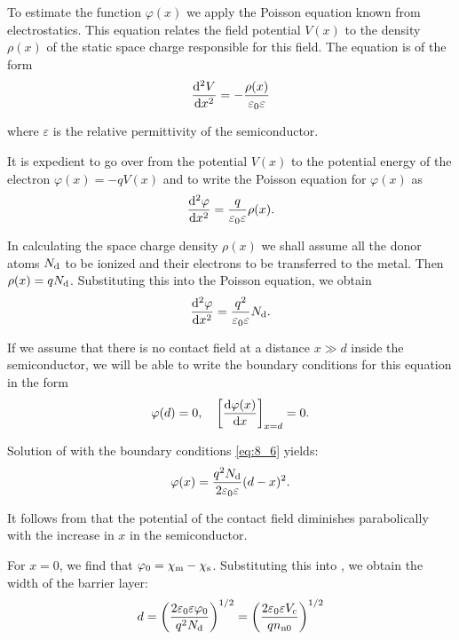 To estimate the function $\varphi(x)$ we apply the Poisson equation known from electrostatics. This equation relates the field potential $V(x)$ to the density $\rho(x)$ of the static space charge responsible for this field. The equation is of the form
\begin{equation}\label{eq:8_3}
    \dfrac{\mathrm{d}^2V}{\mathrm{d} x^2} = - \frac{\rho(x)}{\varepsilon_0 \varepsilon}
\end{equation}

\noindent
where $\varepsilon$ is the relative permittivity of the semiconductor.

It is expedient to go over from the potential $V(x)$ to the potential energy of the electron $\varphi(x)= -qV(x)$ and to write the Poisson equation for $\varphi(x)$ as
\begin{equation}\label{eq:8_4}
    \dfrac{\mathrm{d}^2\varphi}{\mathrm{d} x^2} = \frac{q}{\varepsilon_0 \varepsilon} \rho(x).
\end{equation}

In calculating the space charge density $\rho(x)$ we shall assume all the donor atoms $N_{\text{d}}$ to be ionized and their electrons to be transferred to the metal. Then $\rho(x)=qN_{\text{d}}$. Substituting this into the Poisson equation, we obtain
\begin{equation}\label{eq:8_5}
    \dfrac{\mathrm{d}^2\varphi}{\mathrm{d} x^2} = \frac{q^2}{\varepsilon_0 \varepsilon} N_{\text{d}}.
\end{equation}

If we assume that there is no contact field at a distance $x\gg d$ inside the semiconductor, we will be able to write the boundary conditions for this equation in the form
\begin{equation}\label{eq:8_6}
    \varphi(d) = 0,\quad \left[\dfrac{\mathrm{d}\varphi(x)}{\mathrm{d} x}\right]_{x=d} = 0.
\end{equation}

Solution of  with the boundary conditions \eqref{eq:8_6} yields:
\begin{equation}\label{eq:8_7}
    \varphi(x) = \frac{q^2 N_{\text{d}}}{2\varepsilon_0 \varepsilon} (d - x)^2.
\end{equation}

\noindent
It follows from  that the potential of the contact field diminishes parabolically with the increase in $x$ in the semiconductor.

For $x=0$, we find that $\varphi_0=\chi_{\text{m}}-\chi_{\text{s}}$. Substituting this into , we obtain the width of the barrier layer:
\begin{equation}\label{eq:8_8}
    d = \left(\frac{2 \varepsilon_0 \varepsilon \varphi_0}{q^2 N_{\text{d}}}\right)^{1/2} = \left(\frac{2 \varepsilon_0 \varepsilon V_{\text{c}}}{q n_{\text{n$0$}}}\right)^{1/2}
\end{equation}

